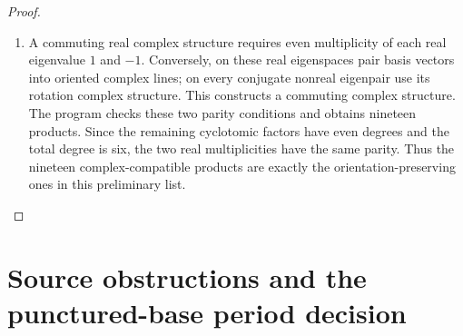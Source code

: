 \documentclass[11pt,a4paper]{article}
\theoremstyle{definition}
\begin{document}
\begin{proof}
\begin{enumerate}[label=\arabic*.]
\item A commuting real complex structure requires even multiplicity
of each real eigenvalue $1$ and $-1$. Conversely, on these real
eigenspaces pair basis vectors into oriented complex lines;
on every conjugate nonreal eigenpair use its rotation complex
structure. This constructs a commuting complex structure.
The program checks these two parity conditions and obtains
nineteen products. Since the remaining cyclotomic factors have
even degrees and the total degree is six, the two real
multiplicities have the same parity. Thus the nineteen
complex-compatible products are exactly the orientation-preserving
ones in this preliminary list.

\end{enumerate}
\end{proof}


\section{Source obstructions and the punctured-base period decision}
\end{document}
